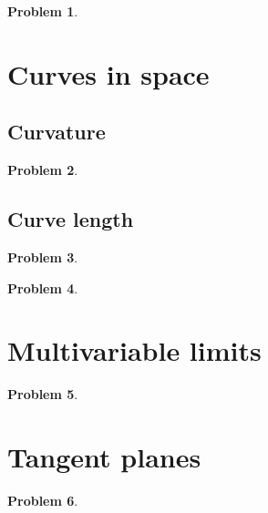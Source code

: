 \documentclass{article}
\newtheorem{problem}{Problem}
\begin{document}
\begin{problem}

\end{problem}


\section{Curves in space}
\subsection{Curvature}


\begin{problem}

\end{problem}


\subsection{Curve length}

\begin{problem}

\end{problem}



\begin{problem}

\end{problem}


\section{Multivariable limits}


\begin{problem}

\end{problem}


\section{Tangent planes}


\begin{problem}

\end{problem}
\end{document}
